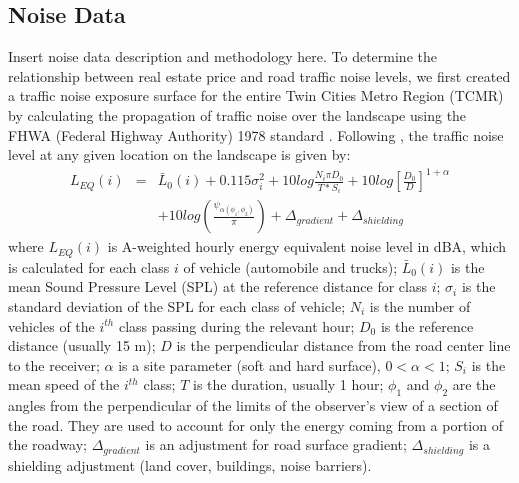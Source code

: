 \documentclass{article}\usepackage{graphicx, color}
\begin{document}
\subsection{Noise Data}
Insert noise data description and methodology here. \citet{Nega2012}
To determine the relationship between real estate price and road traffic noise levels, we first created a traffic noise exposure surface for the entire Twin Cities Metro Region (TCMR) by calculating the propagation of traffic noise over the landscape using the FHWA (Federal Highway Authority) 1978 standard \citep{Barry1978}. Following \citet{Barry1978}, the traffic noise level at any given location on the landscape is given by: 
\begin{eqnarray}\label{eq:noise}
L_{EQ}(i) &=& \bar{L}_0(i) + 0.115 \sigma _i^2 + 10 log \frac{N_i \pi D_0}{T*S_i} + 10 log \left[ \frac{D_0}{D}\right]^{1 + \alpha}  \nonumber \\
&& + 10 log \left( \frac{\psi _{\alpha (\phi _1, \phi _2)}}{\pi}\right) + \Delta _{gradient} + \Delta _{shielding}
\end{eqnarray}
where $L_{EQ}(i)$ is A-weighted hourly energy equivalent noise level in dBA, which is calculated for each class $i$ of vehicle (automobile and trucks); $\bar{L}_0(i)$ is the mean Sound Pressure Level (SPL) at the reference distance for class $i$; $\sigma _i$ is the standard deviation of the SPL for each class of vehicle; $N_i$ is the number of vehicles of the $i^{th}$ class passing during the relevant hour; $D_0$ is the reference distance (usually 15 m); $D$ is the perpendicular distance from the road center line to the receiver; $\alpha$ is a site parameter (soft and hard surface), $0 < \alpha < 1$; $S_i$ is the mean speed of the $i^{th}$ class; $T$ is the duration, usually 1 hour; $\phi _1$ and $\phi _2$ are the angles from the perpendicular of the limits of the observer's view of a section of the road. They are used to account for only the energy coming from a portion of the roadway; $\Delta _{gradient}$ is an adjustment for road surface gradient; $\Delta _{shielding}$ is a shielding adjustment (land cover, buildings, noise barriers).
\end{document}

